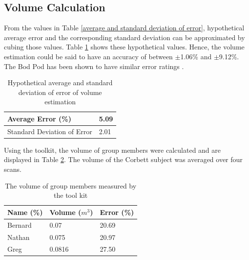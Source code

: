\subsection{Volume Calculation}
\label{testing: volume calculation}
From the values in Table \ref{average and standard deviation of error}, hypothetical average error and the corresponding standard deviation can be approximated by cubing those values. Table \ref{hypothetical average and standard deviation of error} shows these hypothetical values. Hence, the volume estimation could be said to have an accuracy of between $\pm$1.06\% and $\pm$9.12\%. The Bod Pod has been shown to have similar error ratings \cite{fields2001,collins2004}.\\

\begin{table}[!htb]
\begin{center}
  \begin{tabular}{| l | l |}
    \hline
    Average Error (\%) & 5.09\\ \hline
    Standard Deviation of Error & 2.01\\ \hline
  \end{tabular}
\end{center}
\caption{Hypothetical average and standard deviation of error of volume estimation}
\label{hypothetical average and standard deviation of error}
\end{table}

Using the toolkit, the volume of group members were calculated and are displayed in Table \ref{the volume of group members measured by the tool kit}. The volume of the Corbett subject was averaged over four scans.\\

\begin{table}[!htb]
\begin{center}
  \begin{tabular}{| l | l | l |}
    \hline
    Name (\%) & Volume ($m^3$) & Error (\%)\\ \hline
    Bernard & 0.07
 & 20.69\\ \hline
    Nathan & 0.075 & 20.97\\ \hline
    Greg & 0.0816 & 27.50\\ \hline
  \end{tabular}
\end{center}
\caption{The volume of group members measured by the tool kit}
\label{the volume of group members measured by the tool kit}
\end{table}

